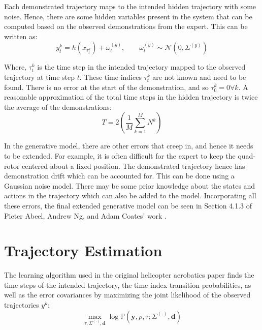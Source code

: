 \documentclass[hidelinks,BTech]{iitmdiss}
\begin{document}
Each demonstrated trajectory maps to the intended hidden trajectory with some noise. Hence, there are some hidden variables present in the system that can be computed based on the observed demonstrations from the expert. This can be written as:
\begin{equation}
  y_{t}^{k} = h(x_{\tau_t^k}) + {\omega}_{t}^{(y)}, \qquad \omega_t^{(y)} \sim \mathcal{N} (0, \Sigma^{(y)})
\end{equation}

Where, $\tau_t^k$ is the time step in the intended trajectory mapped to the observed trajectory at time step $t$. These time indices $\tau_t^k$ are not known and need to be found. There is no error at the start of the demonstration, and so $\tau_0^k = 0 \forall k$. A reasonable approximation of the total time steps in the hidden trajectory is twice the average of the demonstrations:
\begin{equation}
  T = 2 \left( \frac{1}{M} \sum_{k=1}^{M} N^k \right)
\end{equation}

In the generative model, there are other errors that creep in, and hence it needs to be extended. For example, it is often difficult for the expert to keep the quad-rotor centered about a fixed position. The demonstrated trajectory hence has demonstration drift which can be accounted for. This can be done using a Gaussian noise model. There may be some prior knowledge about the states and actions in the trajectory which can also be added to the model. Incorporating all these errors, the final extended generative model can be seen in Section 4.1.3 of Pieter Abeel, Andrew Ng, and Adam Coates' work \cite{ApprenticeshipHelicopterAerobatics}.

\section{Trajectory Estimation}

The learning algorithm used in the original helicopter aerobatics paper \cite{ApprenticeshipHelicopterAerobatics} finds the time steps of the intended trajectory, the time index transition probabilities, as well as the error covariances by maximizing the joint likelihood of the observed trajectories $y^k$:
\begin{equation} \label{eq:ApprenticeshipJointProbability}
  \max_{\tau, \Sigma^{(\cdot)}, \mathbf{d}} \log \mathbb{P}(\mathbf{y}, \rho, \tau ; \Sigma^{(\cdot)}, \mathbf{d})
\end{equation}
\end{document}
